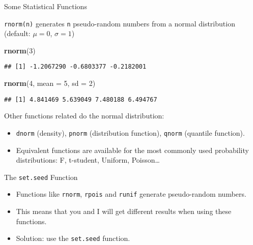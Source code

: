 \documentclass[ignorenonframetext,]{beamer}
\newenvironment{Shaded}{\begin{snugshade}}{\end{snugshade}}
\newcommand{\DataTypeTok}[1]{\textcolor[rgb]{0.13,0.29,0.53}{#1}}
\newcommand{\DecValTok}[1]{\textcolor[rgb]{0.00,0.00,0.81}{#1}}
\newcommand{\KeywordTok}[1]{\textcolor[rgb]{0.13,0.29,0.53}{\textbf{#1}}}
\newcommand{\NormalTok}[1]{#1}
\begin{document}
\begin{frame}[fragile]{Some Statistical Functions}
\protect\hypertarget{some-statistical-functions}{}

\texttt{rnorm(n)} generates \texttt{n} pseudo-random numbers from a
normal distribution (default: \(\mu = 0\), \(\sigma = 1\))

\begin{Shaded}
\begin{Highlighting}[]
\KeywordTok{rnorm}\NormalTok{(}\DecValTok{3}\NormalTok{)}
\end{Highlighting}
\end{Shaded}

\begin{verbatim}
## [1] -1.2067290 -0.6803377 -0.2182001
\end{verbatim}

\begin{Shaded}
\begin{Highlighting}[]
\KeywordTok{rnorm}\NormalTok{(}\DecValTok{4}\NormalTok{, }\DataTypeTok{mean =}  \DecValTok{5}\NormalTok{, }\DataTypeTok{sd =} \DecValTok{2}\NormalTok{)}
\end{Highlighting}
\end{Shaded}

\begin{verbatim}
## [1] 4.841469 5.639049 7.480188 6.494767
\end{verbatim}

Other functions related do the normal distribution:

\begin{itemize}
\item
  \texttt{dnorm} (density), \texttt{pnorm} (distribution function),
  \texttt{qnorm} (quantile function).
\item
  Equivalent functions are available for the most commonly used
  probability distributions: F, t-student, Uniform, Poisson\ldots{}
\end{itemize}

\end{frame}

\begin{frame}[fragile]{The \texttt{set.seed} Function}
\protect\hypertarget{the-set.seed-function}{}

\begin{itemize}
\item
  Functions like \texttt{rnorm}, \texttt{rpois} and \texttt{runif}
  generate pseudo-random numbers.
\item
  This means that you and I will get different results when using these
  functions.
\item
  Solution: use the \texttt{set.seed} function.
\end{itemize}

\end{frame}
\end{document}
